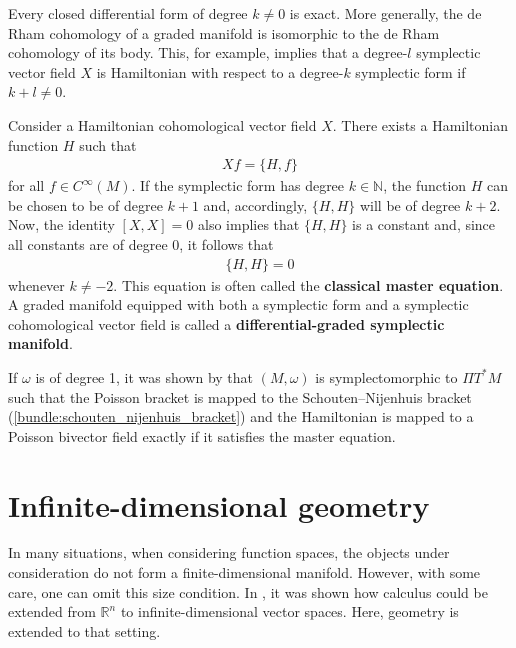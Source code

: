     \begin{property}\label{hdg:global_exactness}
        Every closed differential form of degree $k\neq0$ is exact. More generally, the de Rham cohomology of a graded manifold is isomorphic to the de Rham cohomology of its body. This, for example, implies that a degree-$l$ symplectic vector field $X$ is Hamiltonian with respect to a degree-$k$ symplectic form if $k+l\neq0$.
    \end{property}
    \begin{result}\label{hdg:dg_symplectic_manifold}
        Consider a Hamiltonian cohomological vector field $X$. There exists a Hamiltonian function $H$ such that
        \begin{gather}
            Xf = \{H,f\}
        \end{gather}
        for all $f\in C^\infty(M)$. If the symplectic form has degree $k\in\mathbb{N}$, the function $H$ can be chosen to be of degree $k+1$ and, accordingly, $\{H,H\}$ will be of degree $k+2$. Now, the identity $[X,X] = 0$ also implies that $\{H,H\}$ is a constant and, since all constants are of degree 0, it follows that
        \begin{gather}
            \label{hdg:classical_master_equation}
            \{H,H\}=0
        \end{gather}
        whenever $k\neq-2$. This equation is often called the \textbf{classical master equation}. A graded manifold equipped with both a symplectic form and a symplectic cohomological vector field is called a \textbf{differential-graded symplectic manifold}.

        If $\omega$ is of degree 1, it was shown by  that $(M,\omega)$ is symplectomorphic to $\Pi T^*M$ such that the Poisson bracket is mapped to the Schouten--Nijenhuis bracket (\cref{bundle:schouten_nijenhuis_bracket}) and the Hamiltonian is mapped to a Poisson bivector field exactly if it satisfies the master equation.
    \end{result}

\section{Infinite-dimensional geometry}\label{section:infinite_dimensional}

    In many situations, when considering function spaces, the objects under consideration do not form a finite-dimensional manifold. However, with some care, one can omit this size condition. In , it was shown how calculus could be extended from $\mathbb{R}^n$ to infinite-dimensional vector spaces. Here, geometry is extended to that setting.

